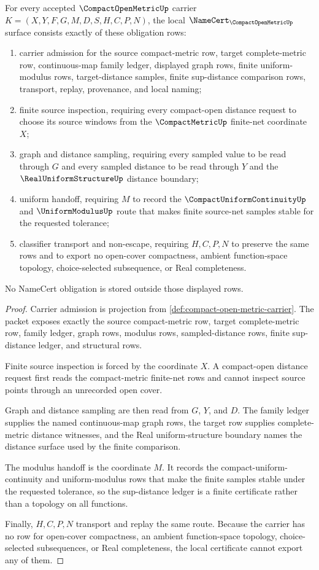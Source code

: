 \begin{theorem}
\label{thm:compact-open-metric-namecert-obligations}
For every accepted $\CompactOpenMetricUp$ carrier $K=(X,Y,F,G,M,D,S,H,C,P,N)$, the local $\NameCert_{\CompactOpenMetricUp}$ surface consists exactly of these obligation rows:
\begin{enumerate}
\item carrier admission for the source compact-metric row, target complete-metric row, continuous-map family ledger, displayed graph rows, finite uniform-modulus rows, target-distance samples, finite sup-distance comparison rows, transport, replay, provenance, and local naming;
\item finite source inspection, requiring every compact-open distance request to choose its source windows from the $\CompactMetricUp$ finite-net coordinate $X$;
\item graph and distance sampling, requiring every sampled value to be read through $G$ and every sampled distance to be read through $Y$ and the $\RealUniformStructureUp$ distance boundary;
\item uniform handoff, requiring $M$ to record the $\CompactUniformContinuityUp$ and $\UniformModulusUp$ route that makes finite source-net samples stable for the requested tolerance;
\item classifier transport and non-escape, requiring $H,C,P,N$ to preserve the same rows and to export no open-cover compactness, ambient function-space topology, choice-selected subsequence, or Real completeness.
\end{enumerate}
No NameCert obligation is stored outside those displayed rows.
\end{theorem}
\begin{proof}
Carrier admission is projection from \autoref{def:compact-open-metric-carrier}. The packet exposes exactly the source compact-metric row, target complete-metric row, family ledger, graph rows, modulus rows, sampled-distance rows, finite sup-distance ledger, and structural rows.

Finite source inspection is forced by the coordinate $X$. A compact-open distance request first reads the compact-metric finite-net rows and cannot inspect source points through an unrecorded open cover.

Graph and distance sampling are then read from $G$, $Y$, and $D$. The family ledger supplies the named continuous-map graph rows, the target row supplies complete-metric distance witnesses, and the Real uniform-structure boundary names the distance surface used by the finite comparison.

The modulus handoff is the coordinate $M$. It records the compact-uniform-continuity and uniform-modulus rows that make the finite samples stable under the requested tolerance, so the sup-distance ledger is a finite certificate rather than a topology on all functions.

Finally, $H,C,P,N$ transport and replay the same route. Because the carrier has no row for open-cover compactness, an ambient function-space topology, choice-selected subsequences, or Real completeness, the local certificate cannot export any of them.
\end{proof}

